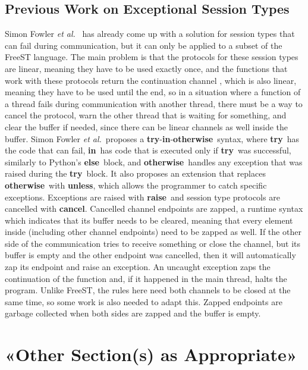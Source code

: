 \documentclass[sigplan]{acmart}
\newcommand{\syntax}[1]{\textbf{#1}}
\newcommand{\tryb}{\syntax{try}}
\newcommand{\elseb}{\syntax{else}}
\newcommand{\raiseb}{\syntax{raise}}
\newcommand{\inb}{\syntax{in}}
\newcommand{\otherwiseb}{\syntax{otherwise}}
\newcommand{\unlessb}{\syntax{unless}}
\newcommand{\cancelb}{\syntax{cancel}}
\newcommand{\etal}{\textit{et al.}}
\newcommand{\simon}{Simon Fowler \etal}
\begin{document}
\subsection{Previous Work on Exceptional Session Types}

\simon~\cite{exceptionssessiontypes} has already come up with a solution for session types that can fail during communication, but it can only be applied to a subset of the FreeST language.
The main problem is that the protocols for these session types are linear, meaning they have to be used exactly once, and the functions that work with these protocols return the continuation channel , which is also linear, meaning they have to be used until the end, so in a situation where a function of a thread fails during communication with another thread, there must be a way to cancel the protocol, warn the other thread that is waiting for something, and clear the buffer if needed, since there can be linear channels as well inside the buffer.
\simon~proposes a \tryb-\inb-\otherwiseb~syntax, where \tryb~has the code that can fail, \inb~has code that is executed only if \tryb~was successful, similarly to Python's \elseb~block, and \otherwiseb~handles any exception that was raised during the \tryb~block.
It also proposes an extension that replaces \otherwiseb~with \unlessb, which allows the programmer to catch specific exceptions.
Exceptions are raised with \raiseb~and session type protocols are cancelled with \cancelb.
Cancelled channel endpoints are zapped, a runtime syntax which indicates that its buffer needs to be cleared, meaning that every element inside (including other channel endpoints) need to be zapped as well.
If the other side of the communication tries to receive something or close the channel, but its buffer is empty and the other endpoint was cancelled, then it will automatically zap its endpoint and raise an exception.
An uncaught exception zaps the continuation of the function and, if it happened in the main thread, halts the program.
Unlike FreeST, the rules here need both channels to be closed at the same time, so some work is also needed to adapt this.
Zapped endpoints are garbage collected when both sides are zapped and the buffer is empty.

\section{«Other Section(s) as Appropriate»} \label{sec:work1}
\end{document}
